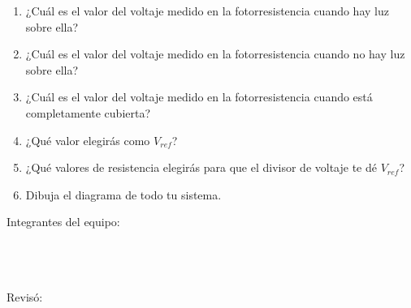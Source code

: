 	\begin{enumerate}
		\item ¿Cuál es el valor del voltaje medido en la fotorresistencia cuando hay luz sobre ella? \newline
		\item ¿Cuál es el valor del voltaje medido en la fotorresistencia cuando no hay luz sobre ella? \newline
		\item ¿Cuál es el valor del voltaje medido en la fotorresistencia cuando está completamente cubierta? \newline
		\item ¿Qué valor elegirás como $V_{ref}$? \newline
		\item ¿Qué valores de resistencia elegirás para que el divisor de voltaje te dé $V_{ref}$? \newline
		\item Dibuja el diagrama de todo tu sistema. \newline \newline \newline \newline \newline \newline \newline \newline \newline \newline \newline \newline \newline \newline \newline
	\end{enumerate}

	Integrantes del equipo: \\[0.2cm]
	\horrule{0.5pt} \\[0.2cm] %
	\horrule{0.5pt} \\[0.2cm] %
	\horrule{0.5pt} \\[0.2cm] %
	\horrule{0.5pt} %

	Revisó: \\[0.2cm]
	\horrule{0.5pt} \\%



